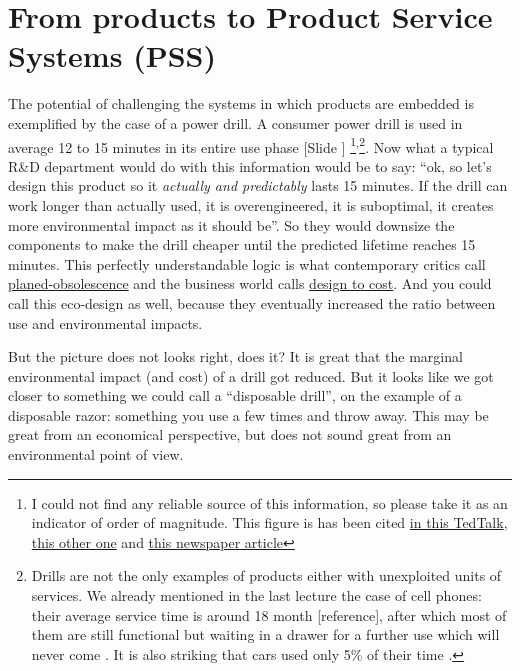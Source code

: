 \documentclass{article}
\newcounter{slide}
\begin{document}
\section{From products to Product Service Systems (PSS)}
\label{sec:pss}
The potential of challenging the systems in which products are embedded is exemplified by the case of a power drill. A consumer power drill is used in average 12 to 15 minutes in its entire use phase {\color{blue}[Slide ]}
\footnote{I could not find any reliable source of this information, so please take it as an indicator of order of magnitude. This figure is has been cited \href{https://www.ted.com/talks/rachel_botsman_the_case_for_collaborative_consumption?language=en}{in this TedTalk}, \href{https://tedxinnovations.ted.com/2015/04/16/spotlight-tedx-talk-how-much-do-you-use-that-power-drill-why-were-sharing-tools-with-everyone-in-our-city/}{this other one} and \href{https://www.fastcompany.com/3050775/the-sharing-economy-is-dead-and-we-killed-it}{this newspaper article}}\textsuperscript{,}\footnote{Drills are not the only examples of products either with unexploited units of services. We already mentioned in the last lecture the case of cell phones: their average service time is around 18 month [reference], after which most of them are still functional but waiting in a drawer for a further use which will never come \cite{hanson2014s}. It is also striking that cars used only 5\% of their time \cite{meijkampChangingConsumerBehaviour1999}.}.
Now what a typical R\&D department would do with this information would be to say: ``ok, so let's design this product so it \emph{actually and predictably} lasts 15 minutes. If the drill can work longer than actually used, it is overengineered, it is suboptimal, it creates more environmental impact as it should be''. So they would downsize the components to make the drill cheaper until the predicted lifetime reaches 15 minutes. This perfectly understandable logic is what contemporary critics call \href{https://en.wikipedia.org/wiki/Planned_obsolescence}{planed-obsolescence} and the business world calls \href{https://en.wikipedia.org/wiki/Design-to-cost}{design to cost}. And you could call this eco-design as well, because they eventually increased the ratio between use and environmental impacts.

But the picture does not looks right, does it? It is great that the marginal environmental impact (and cost) of a drill got reduced. But it looks like we got closer to something we could call a ``disposable drill'', on the example of a disposable razor: something you use a few times and throw away. This may be great from an economical perspective, but does not sound great from an environmental point of view.
\end{document}
